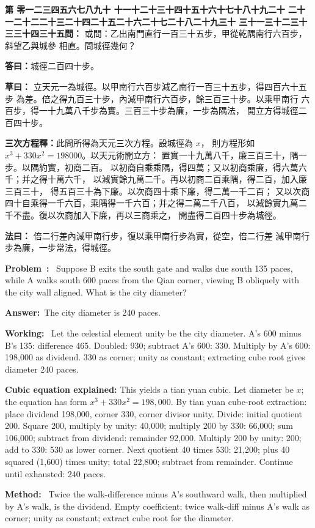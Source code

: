 \documentclass[9pt,a4paper]{article}
\newcounter{probnum}
\newcounter{overallnum}
\newcommand{\chnum}[1]{%
  \ifcase#1 零\or 一\or 二\or 三\or 四\or 五\or 六\or 七\or 八\or 九\or 十\or
    十一\or 十二\or 十三\or 十四\or 十五\or 十六\or 十七\or 十八\or 十九\or 二十\or
    二十一\or 二十二\or 二十三\or 二十四\or 二十五\or 二十六\or 二十七\or 二十八\or 二十九\or 三十\or
    三十一\or 三十二\or 三十三\or 三十四\or 三十五\fi}
\newcommand{\problem}[1]{\stepcounter{probnum}\stepcounter{overallnum}\par\noindent\textbf{\color{volcolor}第\chnum{\value{probnum}}問：}#1\par\vspace{0.15cm}}
\newcommand{\answer}[1]{\par\noindent\textbf{答曰：}#1\par\vspace{0.15cm}}
\newcommand{\working}[1]{\par\noindent\textbf{草曰：}#1\par\vspace{0.15cm}}
\newcommand{\method}[1]{\par\noindent\textbf{法曰：}#1\par\vspace{0.25cm}}
\newcommand{\eproblem}[1]{\par\noindent\textbf{\color{volcolor}Problem~\theoverallnum:}~#1\par\vspace{0.15cm}}
\newcommand{\eanswer}[1]{\par\noindent\textbf{Answer:}~#1\par\vspace{0.15cm}}
\newcommand{\eworking}[1]{\par\noindent\textbf{Working:}~#1\par\vspace{0.15cm}}
\newcommand{\emethod}[1]{\par\noindent\textbf{Method:}~#1\par\vspace{0.25cm}}
\begin{document}
\noindent\begin{minipage}[t]{0.48\textwidth}
\problem{
或問：乙出南門直行一百三十五步，甲從乾隅南行六百步，斜望乙與城參
相直。問城徑幾何？
}

\answer{城徑二百四十步。}

\working{
立天元一為城徑。以甲南行六百步減乙南行一百三十五步，得四百六十五步
為差。倍之得九百三十步，內減甲南行六百步，餘三百三十步。以乘甲南行
六百步，得一十九萬八千步為實。三百三十步為廉，一步為隅法，
開立方得城徑二百四十步。

\textbf{三次方程釋：}此問所得為天元三次方程。設城徑為 $x$，
則方程形如 $x^3 + 330x^2 = 198000$。以天元術開立方：
置實一十九萬八千，廉三百三十，隅一步。以隅約實，初商二百。
以初商自乘乘隅，得四萬；又以初商乘廉，得六萬六千；并之得十萬六千，
以減實餘九萬二千。再以初商二百乘隅，得二百，加入廉三百三十，
得五百三十為下廉。以次商四十乘下廉，得二萬一千二百；
又以次商四十自乘得一千六百，乘隅得一千六百；并之得二萬二千八百，
以減餘實九萬二千不盡。復以次商加入下廉，再以三商乘之，
開盡得二百四十步為城徑。
}

\method{
倍二行差內減甲南行步，復以乘甲南行步為實，從空，倍二行差
減甲南行步為廉，一步常法，得城徑。
}
\end{minipage}%
\hfill%
\begin{minipage}[t]{0.50\textwidth}
\eproblem{
Suppose B exits the south gate and walks due south 135 paces, while A walks
south 600 paces from the Qian corner, viewing B obliquely with the city wall
aligned. What is the city diameter?
}

\eanswer{The city diameter is 240 paces.}

\eworking{
Let the celestial element unity be the city diameter. A's 600 minus B's 135:
difference 465. Doubled: 930; subtract A's 600: 330. Multiply by A's 600:
198,000 as dividend. 330 as corner; unity as constant; extracting cube root
gives diameter 240 paces.

\textbf{Cubic equation explained:} This yields a tian yuan cubic. Let diameter
be $x$; the equation has form $x^3 + 330x^2 = 198{,}000$. By tian yuan
cube-root extraction: place dividend 198,000, corner 330, corner divisor unity.
Divide: initial quotient 200. Square 200, multiply by unity: 40,000;
multiply 200 by 330: 66,000; sum 106,000; subtract from dividend: remainder
92,000. Multiply 200 by unity: 200; add to 330: 530 as lower corner.
Next quotient 40 times 530: 21,200; plus 40 squared (1,600) times unity;
total 22,800; subtract from remainder. Continue until exhausted: 240 paces.
}

\emethod{
Twice the walk-difference minus A's southward walk, then multiplied by A's
walk, is the dividend. Empty coefficient; twice walk-diff minus A's walk as
corner; unity as constant; extract cube root for the diameter.
}
\end{minipage}
\vspace{0.15cm}
\end{document}
